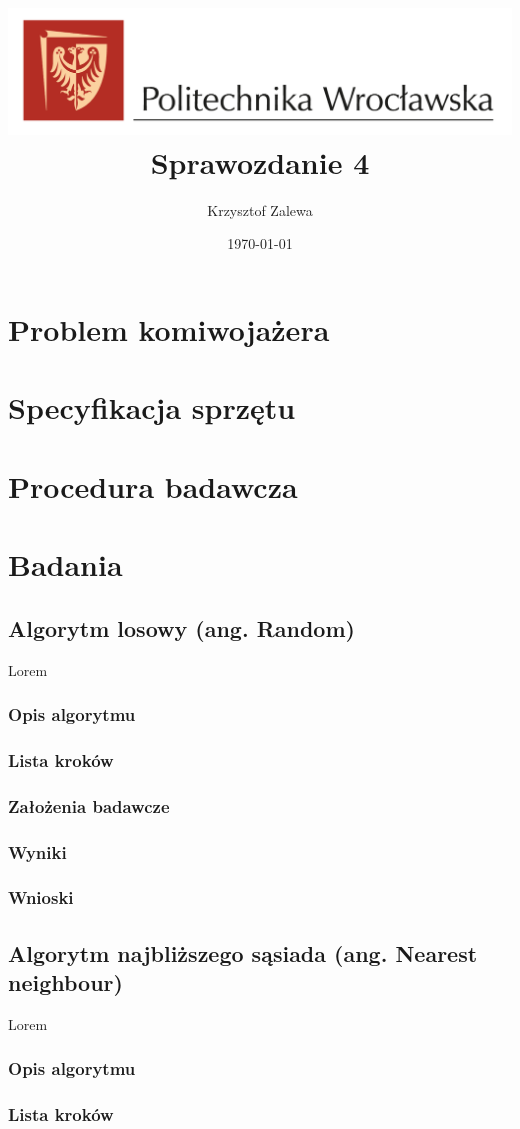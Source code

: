 \documentclass{article}
\title{
  \center\includegraphics[width=\textwidth]{src/images/logo_PWr_kolor_poziom.png}\\
  \fontsize{28pt}{30pt}\selectfont Sprawozdanie 4\\
  \fontsize{14pt}{30pt}\selectfont }
\author{Krzysztof Zalewa}
\date{\daymonthyear\today}
\begin{document}
  \maketitle
  \pagebreak
  \tableofcontents
  \section{Problem komiwojażera}
  \section{Specyfikacja sprzętu}
  \section{Procedura badawcza}
  \section{Badania}
  \subsection{Algorytm losowy (ang. Random)}
  Lorem
  \subsubsection{Opis algorytmu}
  \subsubsection{Lista kroków}
  \subsubsection{Założenia badawcze}

  \subsubsection{Wyniki}
  \subsubsection{Wnioski}
  \subsection{Algorytm najbliższego sąsiada (ang. Nearest neighbour)}
  Lorem
  \subsubsection{Opis algorytmu}
  \subsubsection{Lista kroków}
\end{document}
